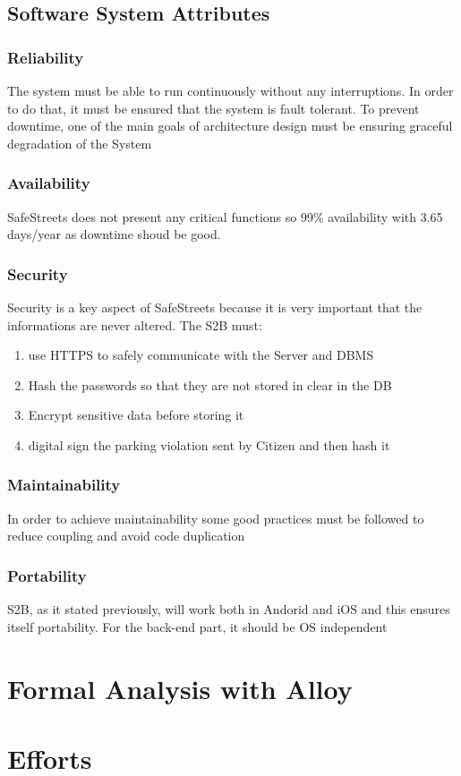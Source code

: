 \documentclass{article}
\begin{document}
\subsection{Software System Attributes}
\subsubsection{Reliability}
The system must be able to run continuously without any interruptions. In order to do that, it must be ensured 
that the system is fault tolerant. To prevent downtime, one of the main goals of architecture design must be 
ensuring graceful degradation of the System
\subsubsection{Availability}
SafeStreets does not present any critical functions so 99\% availability with 3.65 days/year
as downtime shoud be good.  
\subsubsection{Security}
Security is a key aspect of SafeStreets because it is very important that the informations are never altered.
The S2B must:
\begin{enumerate}
 \item use HTTPS to safely communicate with the Server and DBMS    
 \item Hash the passwords so that they are not stored in clear in the DB
 \item Encrypt sensitive data before storing it
 \item digital sign the parking violation sent by Citizen and then hash it  
\end{enumerate} 
\subsubsection{Maintainability}
In order to achieve maintainability some good practices must be followed to reduce coupling and avoid code duplication 
\subsubsection{Portability}
S2B, as it stated previously, will work both in Andorid and iOS and this ensures itself portability. For 
the back-end part, it should be OS independent





\section{Formal Analysis with Alloy}

\section{Efforts}
\end{document}
